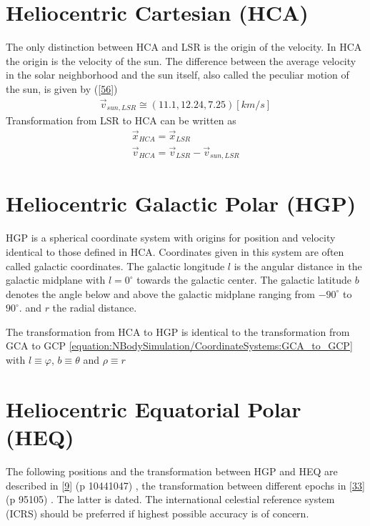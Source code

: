 \documentclass[letterpaper,10pt,english]{sphinxmanual}
\begin{document}
\section{Heliocentric Cartesian (HCA)}
\label{\detokenize{NBodySimulation/CoordinateSystems:heliocentric-cartesian-hca}}
\sphinxAtStartPar
The only distinction between HCA and LSR is the origin of the velocity. In HCA the origin is the velocity of the sun.
The difference between the average velocity in the solar neighborhood and the sun itself, also called the peculiar motion of the sun,
is given by ({[}\hyperlink{cite.NBodySimulation/Appendix:id30}{56}{]})
\begin{equation*}
\begin{split}\vec{v}_{sun,LSR} \cong  (11.1, 12.24, 7.25)[km/s]\end{split}
\end{equation*}
\sphinxAtStartPar
Transformation from LSR to HCA can be written as
\begin{equation*}
\begin{split}\vec{x}_{HCA} = \vec{x}_{LSR} \\
\vec{v}_{HCA} = \vec{v}_{LSR} - \vec{v}_{sun,LSR}\end{split}
\end{equation*}

\section{Heliocentric Galactic Polar (HGP)}
\label{\detokenize{NBodySimulation/CoordinateSystems:heliocentric-galactic-polar-hgp}}
\sphinxAtStartPar
HGP is a spherical coordinate system with origins for position and velocity identical to those defined in HCA.
Coordinates given in this system are often called galactic coordinates.
The galactic longitude \(l\) is the angular distance in the galactic midplane with \(l=0^{\circ}\) towards the galactic center.
The galactic latitude \(b\) denotes the angle below and above the galactic midplane ranging from \(-90^{\circ}\) to \(90^{\circ}\).
and \(r\) the radial distance.

\sphinxAtStartPar
The transformation from HCA to HGP is identical to the transformation from GCA to GCP \eqref{equation:NBodySimulation/CoordinateSystems:GCA_to_GCP} with \(l \equiv \varphi\), \(b \equiv \theta\) and \(\rho \equiv r\)


\section{Heliocentric Equatorial Polar (HEQ)}
\label{\detokenize{NBodySimulation/CoordinateSystems:heliocentric-equatorial-polar-heq}}
\sphinxAtStartPar
The following positions and the transformation between HGP and HEQ are described in {[}\hyperlink{cite.NBodySimulation/Appendix:id32}{9}{]} (p 1044\sphinxhyphen{}1047) ,
the transformation between different epochs in {[}\hyperlink{cite.NBodySimulation/Appendix:id31}{33}{]} (p 95\sphinxhyphen{}105) . The latter is dated.
The international celestial reference system (ICRS) should be preferred if highest possible accuracy is of concern.
\end{document}
